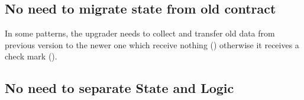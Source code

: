 \subsection{No need to migrate state from old contract}

In some patterns, the upgrader needs to collect and transfer old data from previous version to the newer one which receive nothing (\checkmark) otherwise it receives a check mark (\checkmark). 


\subsection{No need to separate State and Logic}


